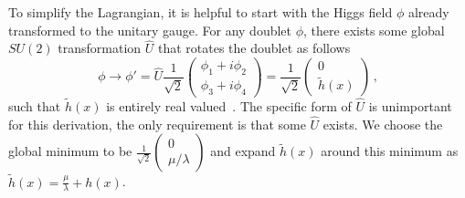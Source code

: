 To simplify the Lagrangian, it is helpful to start with the Higgs field $\phi$ already transformed to the unitary gauge. For any doublet $\phi$, there exists some global $SU(2)$ transformation $\hat{U}$ that rotates the doublet as follows
\begin{equation}
	\phi\to\phi'=\hat{U}\frac{1}{\sqrt{2}}\begin{pmatrix}\phi_1+i\phi_2\\\phi_3+i\phi_4\end{pmatrix}=\frac{1}{\sqrt{2}}\begin{pmatrix}0\\\tilde{h}(x)\end{pmatrix}\,,
\end{equation}
such that $\tilde{h}(x)$ is entirely real valued~\cite{mandl2010quantum}. The specific form of $\hat{U}$ is unimportant for this derivation, the only requirement is that some $\hat{U}$ exists. We choose the global minimum to be $\frac{1}{\sqrt{2}}\begin{pmatrix}0\\\mu/\lambda\end{pmatrix}$ and expand $\tilde{h}(x)$ around this minimum as $\tilde{h}(x)=\frac{\mu}{\lambda}+h(x)$.


